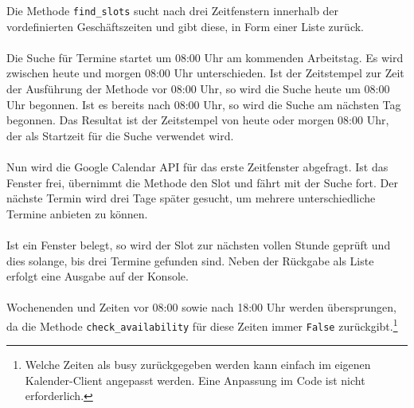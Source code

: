                 Die Methode \verb|find_slots| sucht nach drei Zeitfenstern innerhalb der vordefinierten Geschäftszeiten und gibt diese, in Form einer Liste zurück. \\
                \\
                Die Suche für Termine startet um 08:00 Uhr am kommenden Arbeitstag. Es wird zwischen heute und morgen 08:00 Uhr unterschieden. Ist der Zeitstempel zur Zeit der Ausführung der Methode vor 08:00 Uhr, so wird die Suche heute um 08:00 Uhr begonnen. Ist es bereits nach 08:00 Uhr, so wird die Suche am nächsten Tag begonnen. Das Resultat ist der Zeitstempel von heute oder morgen 08:00 Uhr, der als Startzeit für die Suche verwendet wird. \\
                \\
                Nun wird die Google Calendar API für das erste Zeitfenster abgefragt. Ist das Fenster frei, übernimmt die Methode den Slot und fährt mit der Suche fort. Der nächste Termin wird drei Tage später gesucht, um mehrere unterschiedliche Termine anbieten zu können. \\
                \\
                Ist ein Fenster belegt, so wird der Slot zur nächsten vollen Stunde geprüft und dies solange, bis drei Termine gefunden sind. Neben der Rückgabe als Liste erfolgt eine Ausgabe auf der Konsole.\\
                \\
                Wochenenden und Zeiten vor 08:00 sowie nach 18:00 Uhr werden übersprungen, da die Methode \verb|check_availability| für diese Zeiten immer \verb|False| zurückgibt.\footnote{Welche Zeiten als busy zurückgegeben werden kann einfach im eigenen Kalender-Client angepasst werden. Eine Anpassung im Code ist nicht erforderlich.}

